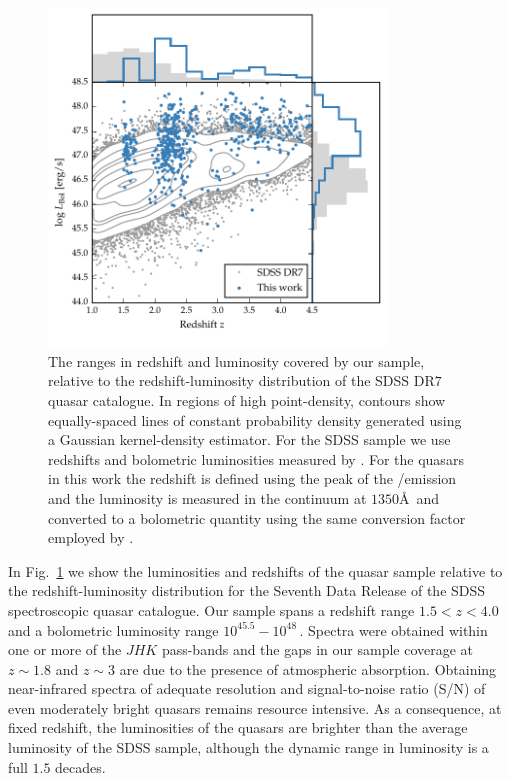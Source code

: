 \begin{figure}[h!]
    \centering
    \includegraphics[width=0.8\textwidth]{figures/chapter02/luminosity_z.pdf} 
    \caption[{The ranges in redshift and luminosity covered by our sample, relative to the redshift-luminosity distribution of the SDSS DR$7$ quasar catalogue.}]{The ranges in redshift and luminosity covered by our sample, relative to the redshift-luminosity distribution of the SDSS DR$7$ quasar catalogue. In regions of high point-density, contours show equally-spaced lines of constant probability density generated using a Gaussian kernel-density estimator. For the SDSS sample we use \citet{hewett10} redshifts and bolometric luminosities measured by \citet{shen11}. For the quasars in this work the redshift is defined using the peak of the \hans/\hb emission and the luminosity is measured in the continuum at $1350$\AA\, and converted to a bolometric quantity using the same conversion factor employed by \citet{shen11}.}     
    \label{fig:lzplane}
\end{figure}

In Fig.~\ref{fig:lzplane} we show the luminosities and redshifts of the quasar sample relative to the redshift-luminosity distribution for the Seventh Data Release \citep[DR$7$;][]{schneider10} of the SDSS spectroscopic quasar catalogue.
Our sample spans a redshift range $1.5 < z < 4.0$ and a bolometric luminosity range $10^{45.5}-10^{48}$\,\ergs. 
Spectra were obtained within one or more of the $JHK$ pass-bands and the gaps in our sample coverage at $z\sim1.8$ and $z\sim3$ are due to the presence of atmospheric absorption. 
Obtaining near-infrared spectra of adequate resolution and signal-to-noise ratio (S/N) of even moderately bright quasars remains resource intensive. 
As a consequence, at fixed redshift, the luminosities of the quasars are brighter than the average luminosity of the SDSS sample, although the dynamic range in luminosity is a full $1.5$ decades.

